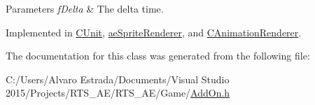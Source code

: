 \begin{DoxyParams}{Parameters}
{\em f\+Delta} & The delta time. \\
\hline
\end{DoxyParams}


Implemented in \hyperlink{class_c_unit_a5f46103027aaf83b2b47c0711640bd69}{C\+Unit}, \hyperlink{classae_sprite_renderer_a65ea9a0ad3452271d2d5b8c140a7eff7}{ae\+Sprite\+Renderer}, and \hyperlink{class_c_animation_renderer_a2ac2237cb706d2f6d45a88a86543e008}{C\+Animation\+Renderer}.



The documentation for this class was generated from the following file\+:\begin{DoxyCompactItemize}
\item 
C\+:/\+Users/\+Alvaro Estrada/\+Documents/\+Visual Studio 2015/\+Projects/\+R\+T\+S\+\_\+\+A\+E/\+R\+T\+S\+\_\+\+A\+E/\+Game/\hyperlink{_add_on_8h}{Add\+On.\+h}\end{DoxyCompactItemize}
